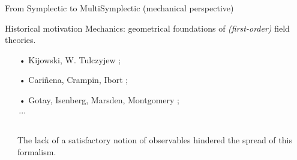 \documentclass[10pt]{beamer}
\begin{document}
\begin{frame}[t]{From Symplectic to MultiSymplectic (mechanical perspective)}
	\begin{block}{Historical motivation}
		Mechanics: geometrical foundations of \textit{(first-order)} field theories.
		\begin{itemize}
		 \item[•] Kijowski, W. Tulczyjew \cite{Kijowski1979}; %
		 \item[•] Cariñena, Crampin, Ibort \cite{Carinena1991b};%
		 \item[•] Gotay, Isenberg, Marsden, Montgomery \cite{Gimmsy1};%
		 \\ $\cdots$
		\end{itemize}
	\end{block}
	\vfill
	\pause
	\begin{tcolorbox}[enhanced,frame hidden,borderline={0.5pt}{0pt}{red,dashed}]
		\color{red}
		\begin{columns}[T]
			\begin{column}{.20\linewidth}
				\begin{center}
					\huge
					\faWarning
				\end{center}
			\end{column}			
			\begin{column}{.60\linewidth}
				\vspace{-.4em}
				\begin{center}
					The lack of a satisfactory notion of observables hindered the spread of this formalism.
				\end{center}
			\end{column}			
			\begin{column}{.20\linewidth}
				\begin{center}
					\huge
					\faWarning
				\end{center}
			\end{column}			
		\end{columns}
	\end{tcolorbox}
	\vfill
	\pause
	\begin{tcolorbox}[enhanced,frame hidden,borderline={0.5pt}{0pt}{blue,dashed}]
		\color{blue}
		\begin{columns}[T]
			\begin{column}{.20\linewidth}

\end{column}
\end{columns}
\end{tcolorbox}
\end{frame}
\end{document}

